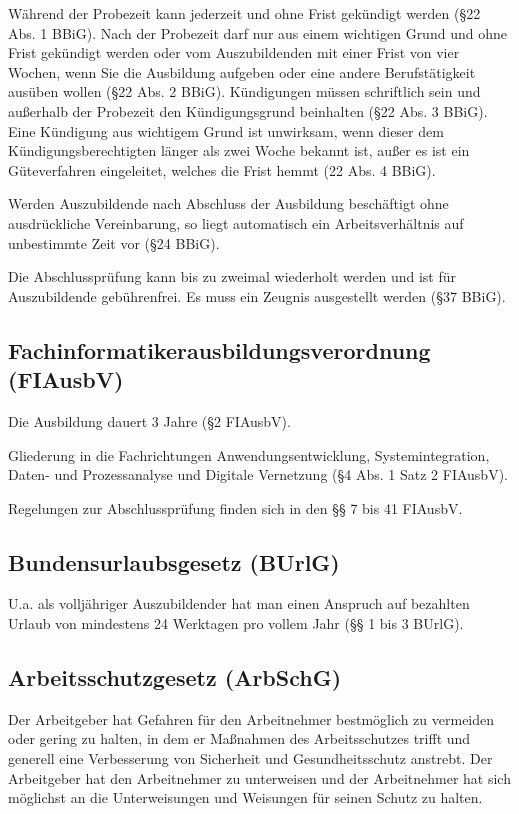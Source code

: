 Während der Probezeit kann jederzeit und ohne Frist gekündigt werden (§22 Abs. 1 BBiG). Nach der Probezeit darf nur aus einem wichtigen Grund und ohne Frist gekündigt werden oder vom Auszubildenden mit einer Frist von vier Wochen, wenn Sie die Ausbildung aufgeben oder eine andere Berufstätigkeit ausüben wollen (§22 Abs. 2 BBiG). Kündigungen müssen schriftlich sein und außerhalb der Probezeit den Kündigungsgrund beinhalten (§22 Abs. 3 BBiG). Eine Kündigung aus wichtigem Grund ist unwirksam, wenn dieser dem Kündigungsberechtigten länger als zwei Woche bekannt ist, außer es ist ein Güteverfahren eingeleitet, welches die Frist hemmt (22 Abs. 4 BBiG).

Werden Auszubildende nach Abschluss der Ausbildung beschäftigt ohne ausdrückliche Vereinbarung, so liegt automatisch ein Arbeitsverhältnis auf unbestimmte Zeit vor (§24 BBiG).

Die Abschlussprüfung kann bis zu zweimal wiederholt werden und ist für Auszubildende gebührenfrei. Es muss ein Zeugnis ausgestellt werden (§37 BBiG).

\subsection{Fachinformatikerausbildungsverordnung (FIAusbV)}

Die Ausbildung dauert 3 Jahre (§2 FIAusbV).

Gliederung in die Fachrichtungen Anwendungsentwicklung, Systemintegration, Daten- und Prozessanalyse und Digitale Vernetzung (§4 Abs. 1 Satz 2 FIAusbV).

Regelungen zur Abschlussprüfung finden sich in den §§ 7 bis 41 FIAusbV.

\subsection{Bundensurlaubsgesetz (BUrlG)}

U.a. als volljähriger Auszubildender hat man einen Anspruch auf bezahlten Urlaub von mindestens 24 Werktagen pro vollem Jahr (§§ 1 bis 3 BUrlG).

\subsection{Arbeitsschutzgesetz (ArbSchG)}

Der Arbeitgeber hat Gefahren für den Arbeitnehmer bestmöglich zu vermeiden oder gering zu halten, in dem er Maßnahmen des Arbeitsschutzes trifft und generell eine Verbesserung von Sicherheit und Gesundheitsschutz anstrebt. Der Arbeitgeber hat den Arbeitnehmer zu unterweisen und der Arbeitnehmer hat sich möglichst an die Unterweisungen und Weisungen für seinen Schutz zu halten.

